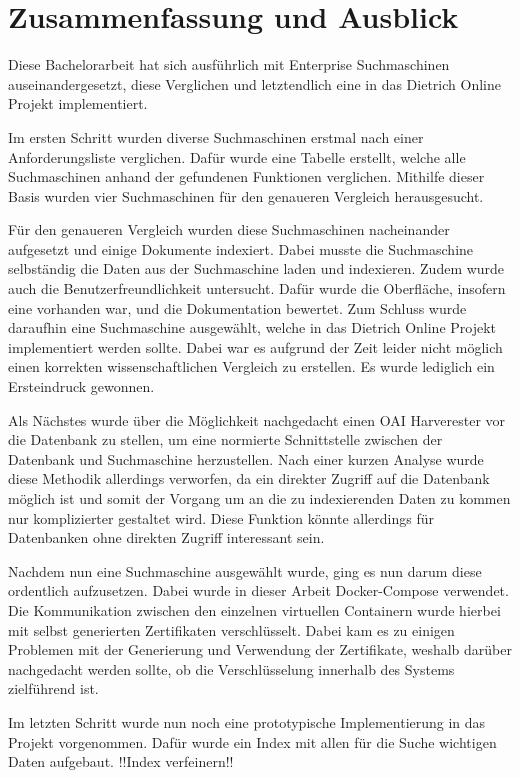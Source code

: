 \chapter{Zusammenfassung und Ausblick}

Diese Bachelorarbeit hat sich ausführlich mit Enterprise Suchmaschinen auseinandergesetzt, diese Verglichen und letztendlich eine in das Dietrich Online Projekt implementiert. 

Im ersten Schritt wurden diverse Suchmaschinen erstmal nach einer Anforderungsliste verglichen. Dafür wurde eine Tabelle erstellt, welche alle Suchmaschinen anhand der gefundenen Funktionen verglichen. Mithilfe dieser Basis wurden vier Suchmaschinen für den genaueren Vergleich herausgesucht.

Für den genaueren Vergleich wurden diese Suchmaschinen nacheinander aufgesetzt und einige Dokumente indexiert. Dabei musste die Suchmaschine selbständig die Daten aus der Suchmaschine laden und indexieren. Zudem wurde auch die Benutzerfreundlichkeit untersucht. Dafür wurde die Oberfläche, insofern eine vorhanden war, und die Dokumentation bewertet. Zum Schluss wurde daraufhin eine Suchmaschine ausgewählt, welche in das Dietrich Online Projekt implementiert werden sollte. Dabei war es aufgrund der Zeit leider nicht möglich einen korrekten wissenschaftlichen Vergleich zu erstellen. Es wurde lediglich ein Ersteindruck gewonnen.

Als Nächstes wurde über die Möglichkeit nachgedacht einen OAI Harverester vor die Datenbank zu stellen, um eine normierte Schnittstelle zwischen der Datenbank und Suchmaschine herzustellen. Nach einer kurzen Analyse wurde diese Methodik allerdings verworfen, da ein direkter Zugriff auf die Datenbank möglich ist und somit der Vorgang um an die zu indexierenden Daten zu kommen nur komplizierter gestaltet wird. Diese Funktion könnte allerdings für Datenbanken ohne direkten Zugriff interessant sein. 

Nachdem nun eine Suchmaschine ausgewählt wurde, ging es nun darum diese ordentlich aufzusetzen. Dabei wurde in dieser Arbeit Docker-Compose verwendet. Die Kommunikation zwischen den einzelnen virtuellen Containern wurde hierbei mit selbst generierten Zertifikaten verschlüsselt. Dabei kam es zu einigen Problemen mit der Generierung und Verwendung der Zertifikate, weshalb darüber nachgedacht werden sollte, ob die Verschlüsselung innerhalb des Systems zielführend ist. 

Im letzten Schritt wurde nun noch eine prototypische Implementierung in das Projekt vorgenommen. Dafür wurde ein Index mit allen für die Suche wichtigen Daten aufgebaut. !!Index verfeinern!!


